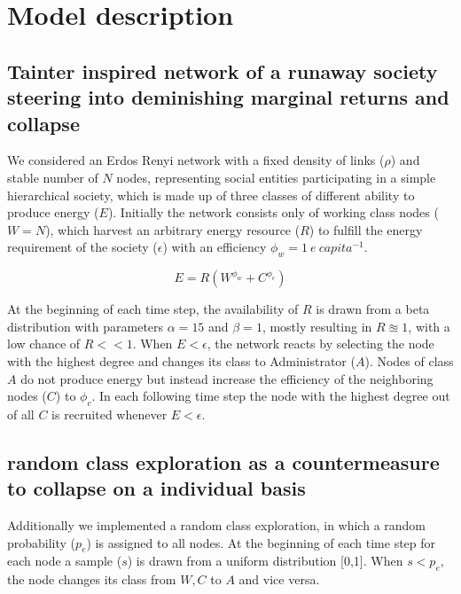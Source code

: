 \section{Model description}


\subsection{Tainter inspired network of a runaway society steering into deminishing marginal returns and collapse}

We considered an Erdos Renyi network with a fixed density of links ($\rho$) and stable number of $N$ nodes, representing social entities participating in a simple hierarchical society, which is made up of three classes of different ability to produce energy ($E$). Initially the network consists only of working class nodes ($W = N$), which harvest an arbitrary energy resource ($R$) to fulfill the energy requirement of the society ($\epsilon$) with an efficiency $\phi_w = 1~e~capita^{-1}$.

\begin{equation}
  E = R (W^{\phi_w} + C^{\phi_c})
\end{equation}

At the beginning of each time step, the availability of $R$ is drawn from a beta distribution with parameters $\alpha = 15$ and $\beta = 1$, mostly resulting in $R \approxeq 1$, with a low chance of $R << 1$. When $E < \epsilon$, the network reacts by selecting the node with the highest degree and changes its class to Administrator ($A$). Nodes of class $A$ do not produce energy but instead increase the efficiency of the neighboring nodes ($C$) to $\phi_c$. In each following time step the node with the highest degree out of all $C$ is recruited whenever $E < \epsilon$.

\subsection{random class exploration as a countermeasure to collapse on a individual basis}

Additionally we implemented a random class exploration, in which a random probability ($p_e$) is assigned to all nodes. At the beginning of each time step for each node a sample ($s$) is drawn from a uniform distribution [0,1]. When $s < p_e$, the node changes its class from $W, C$ to $A$ and vice versa.


